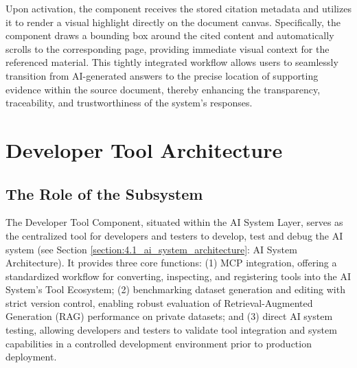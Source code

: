 \documentclass[../Main.tex]{subfiles}
\begin{document}
{{	Upon activation, the 
	component receives the stored citation metadata and utilizes it to render a
	visual highlight directly on the document canvas. Specifically, the component
	draws a bounding box around the cited content and automatically scrolls to the
	corresponding page, providing immediate visual context for the referenced material.
	This tightly integrated workflow allows users to seamlessly transition from AI-generated
	answers to the precise location of supporting evidence within the source
	document, thereby enhancing the transparency, traceability, and trustworthiness
	of the system's responses.

	\section{Developer Tool Architecture}
	\label{section:4.4_developer_tool_architecture}
	\subsection{The Role of the Subsystem}
	\label{section:4.4.1_the_role_of_the_subsystem}
	\begin{condensed_idea}
		The Developer Tool Component, situated within the AI System Layer, serves as the centralized tool for developers and testers to develop, test and debug the AI system (see Section \ref{section:4.1_ai_system_architecture}: AI System Architecture). It provides three core functions: (1) MCP integration, offering a standardized workflow for converting, inspecting, and registering tools into the AI System's Tool Ecosystem; (2) benchmarking dataset generation and editing with strict version control, enabling robust evaluation of Retrieval-Augmented Generation (RAG) performance on private datasets; and (3) direct AI system testing, allowing developers and testers to validate tool integration and system capabilities in a controlled development environment prior to production deployment.
	\end{condensed_idea}

}}
\end{document}
